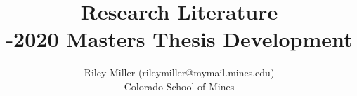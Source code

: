 \documentclass [11pt]{article}
\title{Research Literature\\\medskip 2019-2020 Masters Thesis Development}
\author{Riley Miller (rileymiller@mymail.mines.edu)\\Colorado School of Mines}
\begin{document}
\maketitle
\nocite{*}


\end{document}
